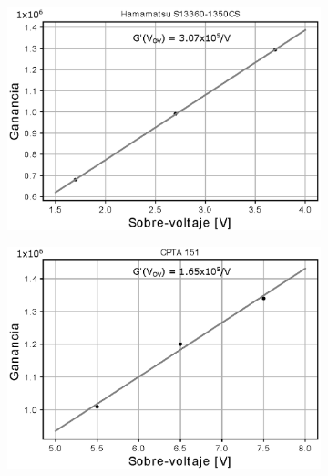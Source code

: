 \begin{figure}[h!]
     \centering
        \caption{Dependencia del sobre-voltaje de la ganancia en los SiPM S13360-1350CS de Hamamatsu (izquierda) y CPTA 151 (derecha) a temperatura ambiente (25 $^\circ$C).}
     \begin{subfigure}[b]{0.49\textwidth}
         \centering
         \includegraphics[width=1.1\textwidth]{Images/GOV_1350CS.eps}
         \label{fig:Gov_1350CS}
     \end{subfigure}
     \begin{subfigure}[b]{0.49\textwidth}
         \centering
         \includegraphics[width=1.1\textwidth]{Images/GOV_CPTA.eps}
         \label{fig:Gov_CPTA}
     \end{subfigure}
        \label{fig:Gain_vs_ov}
\end{figure}
